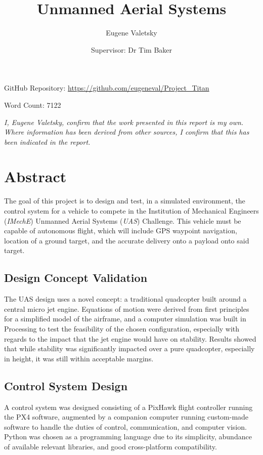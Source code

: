 \documentclass[11pt]{article}
\author{Eugene Valetsky\\ \and Supervisor: Dr Tim Baker}
\title{Unmanned Aerial Systems}
\begin{document}
\maketitle

\begin{center}
    GitHub Repository: \url{https://github.com/eugeneval/Project_Titan}

    \vspace{2em}
    Word Count: 7122

    \vspace{6em}
    \emph{I, Eugene Valetsky, confirm that the work presented in this report is my own. Where information has been derived from other sources, I confirm that this has been indicated in the report.}
\end{center}

\newpage
\tableofcontents
\listoffigures
\newpage



\section{Abstract}
The goal of this project is to design and test, in a simulated environment, the control system for a vehicle to compete in the Institution of Mechanical Engineers (\emph{IMechE}) Unmanned Aerial Systems (\emph{UAS}) Challenge. This vehicle must be capable of autonomous flight, which will include GPS waypoint navigation, location of a ground target, and the accurate delivery onto a payload onto said target\cite{IMechE_rules}.

\subsection*{Design Concept Validation}
The UAS design uses a novel concept: a traditional quadcopter built around a central micro jet engine\cite{Ismail_paper}. Equations of motion were derived from first principles for a simplified model of the airframe, and a computer simulation was built in Processing\cite{processing} to test the feasibility of the chosen configuration, especially with regards to the impact that the jet engine would have on stability. Results showed that while stability was significantly impacted over a pure quadcopter, especially in height, it was still within acceptable margins.

\subsection*{Control System Design}
A control system was designed consisting of a PixHawk flight controller running the PX4 software\cite{PX4_user_guide}, augmented by a companion computer running custom-made software to handle the duties of control, communication, and computer vision. Python\cite{python} was chosen as a programming language due to its simplicity, abundance of available relevant libraries, and good cross-platform compatibility.
\end{document}

